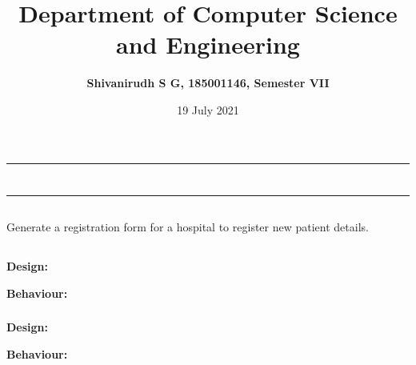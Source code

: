 \documentclass[12pt,letterpaper]{article}
\title{\textbf{Department of Computer Science and Engineering}}
\author{\textbf{Shivanirudh S G, 185001146, Semester VII }}
\date{19 July 2021}
\begin{document}
\maketitle
\hrule
\section*{}
\hrule 
\bigskip\bigskip

\subsection*{}

\subsection*{}
\begin{flushleft}
    Generate a registration form for a hospital to register new patient details.    
\end{flushleft}

\subsection*{}
\subsubsection*{}
\textbf{Design:}
\begin{flushleft}

\end{flushleft}
\textbf{Behaviour:}
\begin{flushleft}

\end{flushleft}


\subsubsection*{}
\textbf{Design:}
\begin{flushleft}

\end{flushleft}
\textbf{Behaviour:}
\begin{flushleft}

\end{flushleft}
\end{document}
